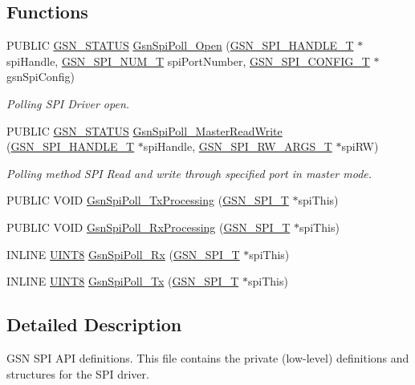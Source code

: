 \subsection*{Functions}
\begin{DoxyCompactItemize}
\item 
PUBLIC \hyperlink{a00660_gada5951904ac6110b1fa95e51a9ddc217}{GSN\_\-STATUS} \hyperlink{a00655_gab8f70d3f443325f36ae63f19133e3adf}{GsnSpiPoll\_\-Open} (\hyperlink{a00238}{GSN\_\-SPI\_\-HANDLE\_\-T} $\ast$spiHandle, \hyperlink{a00587_a8158d263babcdfe1b3b113e23acd1bf7}{GSN\_\-SPI\_\-NUM\_\-T} spiPortNumber, \hyperlink{a00231}{GSN\_\-SPI\_\-CONFIG\_\-T} $\ast$gsnSpiConfig)
\begin{DoxyCompactList}\small\item\em Polling SPI Driver open. \end{DoxyCompactList}\item 
PUBLIC \hyperlink{a00660_gada5951904ac6110b1fa95e51a9ddc217}{GSN\_\-STATUS} \hyperlink{a00655_ga92f3c7ce5633d6ae76f1d37062716676}{GsnSpiPoll\_\-MasterReadWrite} (\hyperlink{a00238}{GSN\_\-SPI\_\-HANDLE\_\-T} $\ast$spiHandle, \hyperlink{a00239}{GSN\_\-SPI\_\-RW\_\-ARGS\_\-T} $\ast$spiRW)
\begin{DoxyCompactList}\small\item\em Polling method SPI Read and write through specified port in master mode. \end{DoxyCompactList}\item 
PUBLIC VOID \hyperlink{a00588_a22ea418a4fbf324bee4eec6fb437d3ce}{GsnSpiPoll\_\-TxProcessing} (\hyperlink{a00230}{GSN\_\-SPI\_\-T} $\ast$spiThis)
\item 
PUBLIC VOID \hyperlink{a00588_a5f72b98eb2afbbdd4230f1cd26214a40}{GsnSpiPoll\_\-RxProcessing} (\hyperlink{a00230}{GSN\_\-SPI\_\-T} $\ast$spiThis)
\item 
INLINE \hyperlink{a00660_gab27e9918b538ce9d8ca692479b375b6a}{UINT8} \hyperlink{a00588_a1fedcea7942556146c9295dc2700b7b8}{GsnSpiPoll\_\-Rx} (\hyperlink{a00230}{GSN\_\-SPI\_\-T} $\ast$spiThis)
\item 
INLINE \hyperlink{a00660_gab27e9918b538ce9d8ca692479b375b6a}{UINT8} \hyperlink{a00588_a10071588969eaa36836f01ae5526d043}{GsnSpiPoll\_\-Tx} (\hyperlink{a00230}{GSN\_\-SPI\_\-T} $\ast$spiThis)
\end{DoxyCompactItemize}


\subsection{Detailed Description}
GSN SPI API definitions. This file contains the private (low-\/level) definitions and structures for the SPI driver. 

